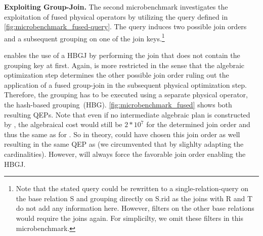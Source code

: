 \textbf{Exploiting Group-Join.}
The second microbenchmark investigates the exploitation of fused physical operators by utilizing the query defined in \autoref{fig:microbenchmark_fused-query}.  The query induces two possible join orders and a subsequent grouping on one of the join keys.\footnote{Note that the stated query could be rewritten to a single-relation-query on the base relation S and grouping directly on S.rid as the joins with R and T do not add any information here.  However, filters on the other base relations would require the joins again.  For simplicilty, we omit these filters in this microbenchmark.}

\holistic enables the use of a HBGJ by performing the join that does not contain the grouping key at first.  Again, \split is more restricted in the sense that the algebraic optimization step determines the other possible join order ruling out the application of a fused group-join in the subsequent physical optimization step.  Therefore, the grouping has to be executed using a separate physical operator, \ie the hash-based grouping~(HBG).  \autoref{fig:microbenchmark_fused} shows both resulting QEPs.  Note that even if no intermediate algebraic plan is constructed by \holistic, the algebraical cost would still be $2*10^7$ for the determined join order and thus the same as for \split.  So in theory, \split could have chosen this join order as well resulting in the same QEP as \holistic (we circumvented that by slighlty adapting the cardinalities).  However, \holistic will always force the favorable join order enabling the HBGJ.

